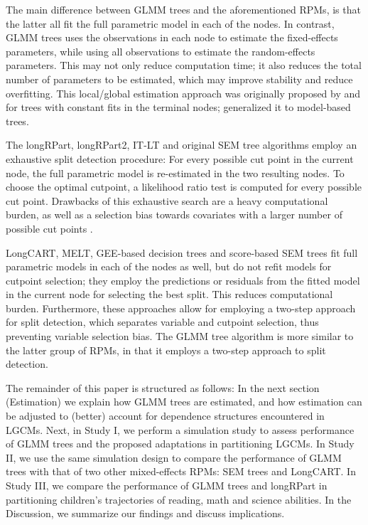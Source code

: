 \documentclass[doc,floatsintext,natbib]{apa7}
\begin{document}
The main difference between GLMM trees and the aforementioned RPMs, is that the latter all fit the full parametric model in each of the nodes. In contrast, GLMM trees uses the observations in each node to estimate the fixed-effects parameters, while using all observations to estimate the random-effects parameters. This may not only reduce computation time; it also reduces the total number of parameters to be estimated, which may improve stability and reduce overfitting. This local/global estimation approach was originally proposed by \cite{HajjyBell11} and \cite{SelaySimo12} for trees with constant fits in the terminal nodes; \cite{FokkySmit18} generalized it to model-based trees.

The longRPart, longRPart2, IT-LT and original SEM tree algorithms employ an exhaustive split detection procedure: For every possible cut point in the current node, the full parametric model is re-estimated in the two resulting nodes. To choose the optimal cutpoint, a likelihood ratio test is computed for every possible cut point. Drawbacks of this exhaustive search are a heavy computational burden, as well as a selection bias towards covariates with a larger number of possible cut points \citep{ShihyTsai04, Shih04}. 

LongCART, MELT, GEE-based decision trees and score-based SEM trees fit full parametric models in each of the nodes as well, but do not refit models for cutpoint selection; they employ the predictions or residuals from the fitted model in the current node for selecting the best split. This reduces computational burden. Furthermore, these approaches allow for employing a two-step approach for split detection, which separates variable and cutpoint selection, thus preventing variable selection bias. The GLMM tree algorithm is more similar to the latter group of RPMs, in that it employs a two-step approach to split detection.

The remainder of this paper is structured as follows: In the next section (Estimation) we explain how GLMM trees are estimated, and how estimation can be adjusted to (better) account for dependence structures encountered in LGCMs. Next, in Study I, we perform a simulation study to assess performance of GLMM trees and the proposed adaptations in partitioning LGCMs. In Study II, we use the same simulation design to compare the performance of GLMM trees with that of two other mixed-effects RPMs: SEM trees and LongCART.  In Study III, we compare the performance of GLMM trees and longRPart in partitioning children's trajectories of reading, math and science abilities. In the Discussion, we summarize our findings and discuss implications.
\end{document}

